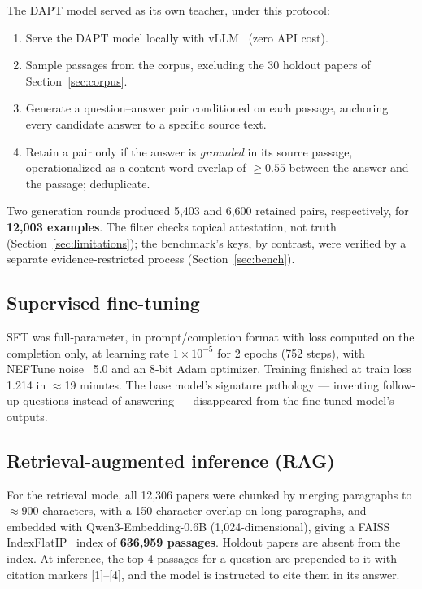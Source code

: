 \documentclass[11pt]{article}
\begin{document}
The DAPT model served as its own teacher, under this protocol:
\begin{enumerate}
\item Serve the DAPT model locally with vLLM~\cite{vllm} (zero API cost).
\item Sample passages from the corpus, excluding the 30 holdout papers of
Section~\ref{sec:corpus}.
\item Generate a question--answer pair conditioned on each passage,
anchoring every candidate answer to a specific source text.
\item Retain a pair only if the answer is \emph{grounded} in its source
passage, operationalized as a content-word overlap of $\geq 0.55$ between
the answer and the passage; deduplicate.
\end{enumerate}
Two generation rounds produced 5,403 and 6,600 retained pairs,
respectively, for \textbf{12,003 examples}. The filter checks
topical attestation, not truth (Section~\ref{sec:limitations}); the
benchmark's keys, by contrast, were verified by a separate
evidence-restricted process (Section~\ref{sec:bench}).

\subsection{Supervised fine-tuning}
\label{sec:sft-train}

SFT was full-parameter, in prompt/completion format with loss computed on
the completion only, at learning rate $1\times10^{-5}$ for 2 epochs
(752 steps), with NEFTune noise~\cite{neftune} 5.0 and an 8-bit Adam
optimizer. Training finished at train loss 1.214 in $\approx$19 minutes.
The base model's
signature pathology --- inventing follow-up questions instead of
answering --- disappeared from the fine-tuned model's outputs.

\subsection{Retrieval-augmented inference (RAG)}
\label{sec:rag}

For the retrieval mode, all 12,306 papers were chunked by merging
paragraphs to $\approx$900 characters, with a 150-character overlap on
long paragraphs, and embedded with Qwen3-Embedding-0.6B
(1,024-dimensional), giving a FAISS IndexFlatIP~\cite{faiss} index of
\textbf{636,959 passages}. Holdout papers are absent from the index. At
inference, the top-4 passages for a question are prepended to it with
citation markers [1]--[4], and the model is instructed to cite them in
its answer.
\end{document}
